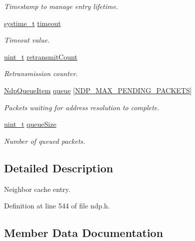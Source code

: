 \begin{DoxyCompactItemize}
\begin{DoxyCompactList}\small\item\em Timestamp to manage entry lifetime. \end{DoxyCompactList}\item 
\hyperlink{compiler__port_8h_ae3e32a98d431a02106616da3071832dd}{systime\+\_\+t} \hyperlink{structNdpNeighborCacheEntry_a315eba9b9511bfbfc60b9559b37e7070}{timeout}
\begin{DoxyCompactList}\small\item\em Timeout value. \end{DoxyCompactList}\item 
\hyperlink{compiler__port_8h_a12a1e9b3ce141648783a82445d02b58d}{uint\+\_\+t} \hyperlink{structNdpNeighborCacheEntry_a4814680905745d10b71447d63db67a1c}{retransmit\+Count}
\begin{DoxyCompactList}\small\item\em Retransmission counter. \end{DoxyCompactList}\item 
\hyperlink{structNdpQueueItem}{Ndp\+Queue\+Item} \hyperlink{structNdpNeighborCacheEntry_a96ee1ce22a34ce6fbe999554aed2ec3d}{queue} \mbox{[}\hyperlink{net__config_8h_af20ff817ba73edd4451c0fb8dfb6e5b2}{N\+D\+P\+\_\+\+M\+A\+X\+\_\+\+P\+E\+N\+D\+I\+N\+G\+\_\+\+P\+A\+C\+K\+E\+TS}\mbox{]}
\begin{DoxyCompactList}\small\item\em Packets waiting for address resolution to complete. \end{DoxyCompactList}\item 
\hyperlink{compiler__port_8h_a12a1e9b3ce141648783a82445d02b58d}{uint\+\_\+t} \hyperlink{structNdpNeighborCacheEntry_ac6639d88295e91df681f7e0fcb88c83b}{queue\+Size}
\begin{DoxyCompactList}\small\item\em Number of queued packets. \end{DoxyCompactList}\end{DoxyCompactItemize}


\subsection{Detailed Description}
Neighbor cache entry. 

Definition at line 544 of file ndp.\+h.



\subsection{Member Data Documentation}
\mbox{\label{structNdpNeighborCacheEntry_a3c02dac138bb8d8ae45ad1de8c324221}} 
